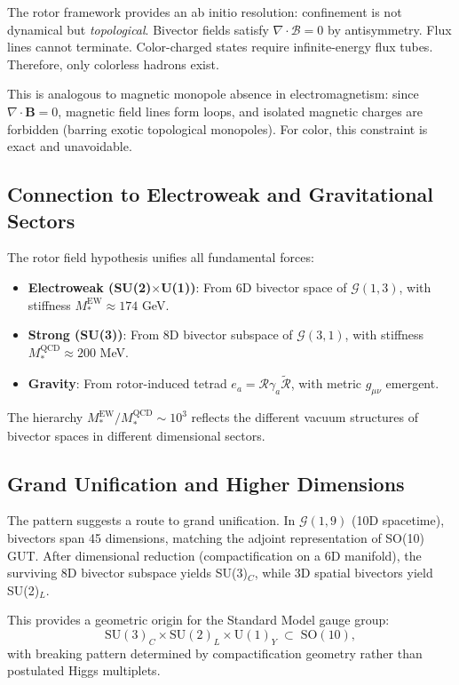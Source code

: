 \documentclass[11pt,a4paper]{article}
\newcommand{\rev}[1]{\widetilde{#1}}           %
\newcommand{\Rotor}{\mathcal{R}}
\newcommand{\Biv}{\mathcal{B}}
\newcommand{\Cl}{\mathcal{G}}
\newcommand{\D}{\nabla}
\newcommand{\SU}{\mathrm{SU}}
\newcommand{\U}{\mathrm{U}}
\newcommand{\SO}{\mathrm{SO}}
\theoremstyle{definition}
\theoremstyle{plain}
\theoremstyle{remark}
\begin{document}
The rotor framework provides an ab initio resolution: confinement is not dynamical but \emph{topological}. Bivector fields satisfy $\D \cdot \Biv = 0$ by antisymmetry. Flux lines cannot terminate. Color-charged states require infinite-energy flux tubes. Therefore, only colorless hadrons exist.

This is analogous to magnetic monopole absence in electromagnetism: since $\nabla \cdot \mathbf{B} = 0$, magnetic field lines form loops, and isolated magnetic charges are forbidden (barring exotic topological monopoles). For color, this constraint is exact and unavoidable.

\subsection{Connection to Electroweak and Gravitational Sectors}

The rotor field hypothesis unifies all fundamental forces:
\begin{itemize}[leftmargin=*,itemsep=3pt]
  \item \textbf{Electroweak (SU(2)$\times$U(1))}: From 6D bivector space of $\Cl(1,3)$, with stiffness $M_\ast^{\mathrm{EW}} \approx 174$ GeV.
  \item \textbf{Strong (SU(3))}: From 8D bivector subspace of $\Cl(3,1)$, with stiffness $M_\ast^{\mathrm{QCD}} \approx 200$ MeV.
  \item \textbf{Gravity}: From rotor-induced tetrad $e_a = \Rotor \gamma_a \rev{\Rotor}$, with metric $g_{\mu\nu}$ emergent.
\end{itemize}

The hierarchy $M_\ast^{\mathrm{EW}} / M_\ast^{\mathrm{QCD}} \sim 10^3$ reflects the different vacuum structures of bivector spaces in different dimensional sectors.

\subsection{Grand Unification and Higher Dimensions}

The pattern suggests a route to grand unification. In $\Cl(1,9)$ (10D spacetime), bivectors span 45 dimensions, matching the adjoint representation of SO(10) GUT. After dimensional reduction (compactification on a 6D manifold), the surviving 8D bivector subspace yields SU(3)$_C$, while 3D spatial bivectors yield SU(2)$_L$.

This provides a geometric origin for the Standard Model gauge group:
\begin{equation}
\SU(3)_C \times \SU(2)_L \times \U(1)_Y \;\subset\; \SO(10),
\end{equation}
with breaking pattern determined by compactification geometry rather than postulated Higgs multiplets.
\end{document}
